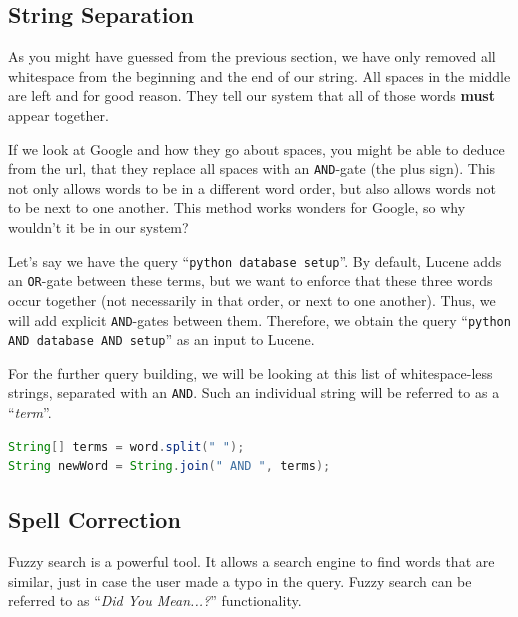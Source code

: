 \documentclass[11pt]{article}
\begin{document}
\subsection{String Separation}
As you might have guessed from the previous section, we have only removed all whitespace from the beginning and the end of our string. All spaces in the middle are left and for good reason. They tell our system that all of those words \textbf{must} appear together.

If we look at Google and how they go about spaces, you might be able to deduce from the url, that they replace all spaces with an \texttt{AND}-gate (the plus sign). This not only allows words to be in a different word order, but also allows words not to be next to one another. This method works wonders for Google, so why wouldn't it be in our system?

Let's say we have the query ``\texttt{python database setup}''. By default, Lucene adds an \texttt{OR}-gate between these terms, but we want to enforce that these three words occur together (not necessarily in that order, or next to one another). Thus, we will add explicit \texttt{AND}-gates between them. Therefore, we obtain the query ``\texttt{python AND database AND setup}'' as an input to Lucene.

For the further query building, we will be looking at this list of whitespace-less strings, separated with an \texttt{AND}. Such an individual string will be referred to as a ``\textit{term}''.
\begin{lstlisting}[language=Java]
String[] terms = word.split(" ");
String newWord = String.join(" AND ", terms);
\end{lstlisting}

\subsection{Spell Correction}
Fuzzy search is a powerful tool. It allows a search engine to find words that are similar, just in case the user made a typo in the query. Fuzzy search can be referred to as ``\textit{Did You Mean...?}'' functionality.
\end{document}
